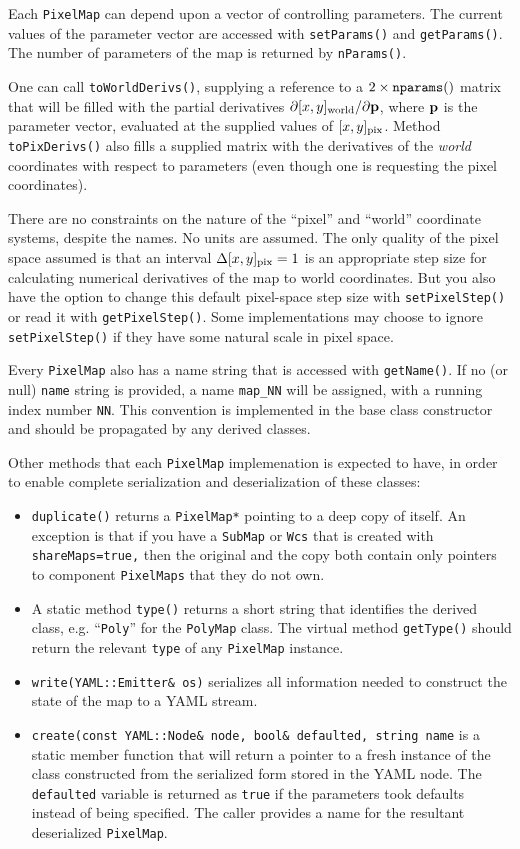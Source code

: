 \documentclass[11pt,preprint,flushrt]{aastex}
\begin{document}
Each {\tt PixelMap} can depend upon a vector of controlling parameters.  The current values of the parameter vector are accessed with {\tt setParams()} and {\tt getParams()}.  The number of parameters of the map is returned by {\tt nParams()}. 

One can call {\tt toWorldDerivs()}, supplying a reference to a $2\times{\tt nparams()}$ matrix that will be filled with the partial derivatives $\partial[x,y]_{\rm world} / \partial {\bf p}$, where ${\bf p}$ is the parameter vector, evaluated at the supplied values of $[x,y]_{\rm pix}$.  Method {\tt toPixDerivs()} also fills a supplied matrix with the derivatives of the {\em world} coordinates with respect to parameters (even though one is requesting the pixel coordinates).

There are no constraints on the nature of the ``pixel'' and ``world'' coordinate systems, despite the names.  No units are assumed.  The only quality of the pixel space assumed is that an interval $\Delta [x,y]_{\rm pix}=1$ is an appropriate step size for calculating numerical derivatives of the map to world coordinates.  But you also have the option to change this default pixel-space step size with {\tt setPixelStep()} or read it with {\tt getPixelStep()}.  Some implementations may choose to ignore {\tt setPixelStep()} if they have some natural scale in pixel space.

Every {\tt PixelMap} also has a name string that is accessed with {\tt getName()}.  If no (or null) {\tt name} string is provided, a name {\tt map\_NN} will be assigned, with a running index number  {\tt NN}.  This convention is implemented in the base class constructor and should be propagated by any derived classes.

Other methods that each {\tt PixelMap} implemenation is expected to have, in order to enable complete serialization and deserialization of these classes:
\begin{itemize}
\item {\tt duplicate()} returns a {\tt PixelMap*} pointing to a deep copy of itself. An exception is that if you have a {\tt SubMap} or {\tt Wcs} that is created with {\tt shareMaps=true,} then the original and the copy both contain only pointers to component {\tt PixelMaps} that they do not own.
\item A static method {\tt type()} returns a short string that identifies the derived class,  e.g. ``{\tt Poly}'' for the {\tt PolyMap} class. The virtual method \texttt{getType()} should return the relevant \texttt{type} of any \texttt{PixelMap} instance.
\item {\tt  write(YAML::Emitter\& os)} serializes all information needed to construct the state of the map to a YAML stream.
\item \texttt{create(const YAML::Node\& node,
			    bool\& defaulted,
			    string name} is a static member function that will return a pointer to a fresh
instance of the class constructed from the serialized form stored in the YAML node.  The \texttt{defaulted} variable is returned as \texttt{true} if the parameters took defaults instead of being specified.  The caller provides a name for the resultant deserialized \texttt{PixelMap}.
\end{itemize}
\end{document}
